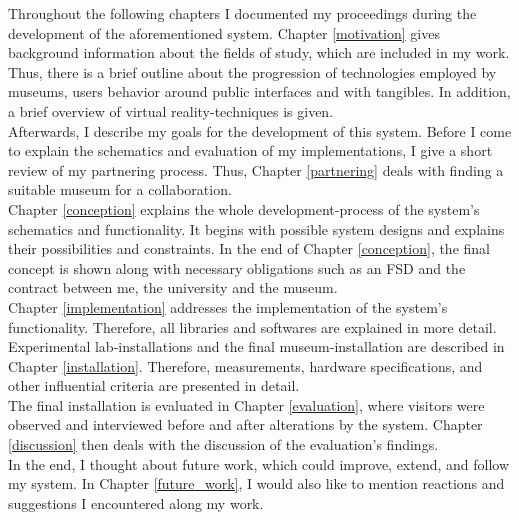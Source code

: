 

Throughout the following chapters I documented my proceedings during the development of the aforementioned system. Chapter \ref{motivation} gives background information about the fields of study, which are included in my work. Thus, there is a brief outline about the progression of technologies employed by museums, users behavior around public interfaces and with tangibles. In addition, a brief overview of virtual reality-techniques is given.
\\
Afterwards, I describe my goals for the development of this system. Before I come to explain the schematics and evaluation of my implementations, I give a short review of my partnering process. Thus, Chapter \ref{partnering} deals with finding a suitable museum for a collaboration. 
\\
Chapter \ref{conception} explains the whole development-process of the system's schematics and functionality. It begins with possible system designs and explains their possibilities and constraints. In the end of Chapter \ref{conception}, the final concept is shown along with necessary obligations such as an \ac{FSD} and the contract between me, the university and the museum.
\\
Chapter \ref{implementation} addresses the implementation of the system's functionality. Therefore, all libraries and softwares are explained in more detail.
\\
Experimental lab-installations and the final museum-installation are described in Chapter \ref{installation}. Therefore, measurements, hardware specifications, and other influential criteria are presented in detail.
\\
The final installation is evaluated in Chapter \ref{evaluation}, where visitors were observed and interviewed before and after alterations by the system. Chapter \ref{discussion} then deals with the discussion of the evaluation's findings.
\\
In the end, I thought about future work, which could improve, extend, and follow my system. In Chapter \ref{future_work}, I would also like to mention reactions and suggestions I encountered along my work.

